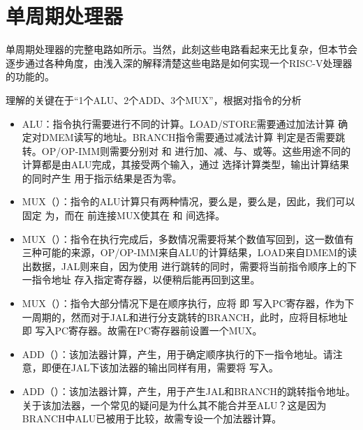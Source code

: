 \section{单周期处理器}

单周期处理器的完整电路如所示。当然，此刻这些电路看起来无比复杂，但本节会逐步通过各种角度，由浅入深的解释清楚这些电路是如何实现一个RISC-V处理器的功能的。

理解的关键在于“1个ALU、2个ADD、3个MUX”，根据对指令的分析
\begin{itemize}
    \item ALU：指令执行需要进行不同的计算。LOAD/STORE需要通过加法计算 确定对DMEM读写的地址。BRANCH指令需要通过减法计算 判定是否需要跳转。OP/OP-IMM则需要分别对 和 进行加、减、与、或等。这些用途不同的计算都是由ALU完成，其接受两个输入，通过 选择计算类型，输出计算结果 的同时产生 用于指示结果是否为零。
    \item MUX（）：指令的ALU计算只有两种情况，要么是，要么是，因此，我们可以固定 为，而在 前连接MUX使其在 和 间选择。
    \item MUX（）：指令在执行完成后，多数情况需要将某个数值写回到，这一数值有三种可能的来源，OP/OP-IMM来自ALU的计算结果，LOAD来自DMEM的读出数据，JAL则来自，因为使用 进行跳转的同时，需要将当前指令顺序上的下一指令地址 存入指定寄存器，以便稍后能再回到这里。
    \item MUX（）：指令大部分情况下是在顺序执行，应将 即 写入PC寄存器，作为下一周期的，然而对于JAL和进行分支跳转的BRANCH，此时，应将目标地址 即 写入PC寄存器。故需在PC寄存器前设置一个MUX。
    \item ADD（）：该加法器计算，产生，用于确定顺序执行的下一指令地址。请注意，即便在JAL下该加法器的输出同样有用，需要将 写入。
    \item ADD（）：该加法器计算，产生，用于产生JAL和BRANCH的跳转指令地址。关于该加法器，一个常见的疑问是为什么其不能合并至ALU？这是因为BRANCH中ALU已被用于比较，故需专设一个加法器计算。
\end{itemize}

